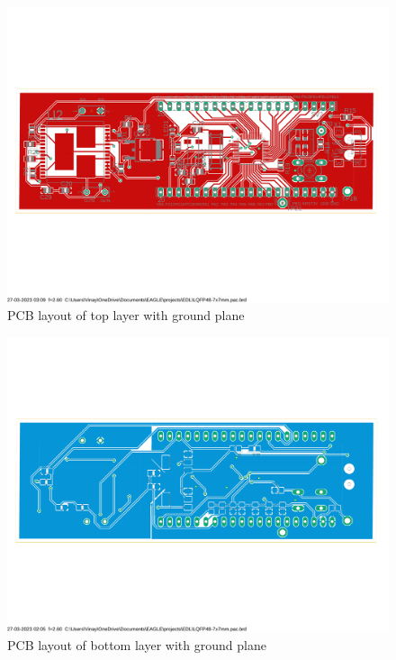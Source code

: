 \documentclass{article}
\begin{document}
\begin{figure}[htp]
    \centering
    \includegraphics[width=\textwidth]{Images/ourpcbtopgplane.pdf}
    \caption{PCB layout of top layer with ground plane}
    \label{fig:galaxy}
\end{figure}

\begin{figure}[htp]
    \centering
    \includegraphics[width=\textwidth]{Images/ourpcbbottomgplane.pdf}
    \caption{PCB layout of bottom layer with ground plane}
    \label{fig:galaxy}
\end{figure}

\newpage
\end{document}
